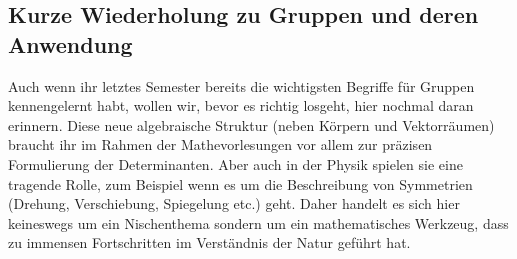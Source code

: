 \subsection{Kurze Wiederholung zu Gruppen und deren Anwendung}
Auch wenn ihr letztes Semester bereits die wichtigsten Begriffe für Gruppen kennengelernt habt, wollen wir, bevor es richtig losgeht, hier nochmal daran erinnern. Diese neue algebraische Struktur (neben Körpern und Vektorräumen) braucht ihr im Rahmen der Mathevorlesungen vor allem zur präzisen Formulierung der Determinanten. Aber auch in der Physik spielen sie eine tragende Rolle, zum Beispiel wenn es um die Beschreibung von Symmetrien (Drehung, Verschiebung, Spiegelung etc.) geht. Daher handelt es sich hier keineswegs um ein Nischenthema sondern um ein mathematisches Werkzeug, dass zu immensen Fortschritten im Verständnis der Natur geführt hat. \\


